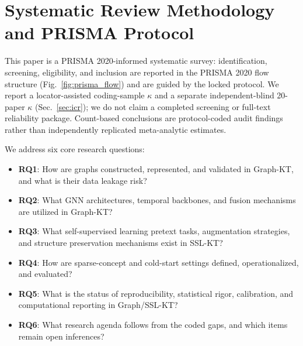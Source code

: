 \documentclass[lettersize,journal]{IEEEtran}
\begin{document}
\section{Systematic Review Methodology and PRISMA Protocol}
\label{sec:methodology}

This paper is a PRISMA 2020-informed systematic survey: identification, screening, eligibility, and inclusion are reported in the PRISMA 2020 flow structure (Fig.~\ref{fig:prisma_flow}) and are guided by the locked protocol. We report a locator-assisted coding-sample $\kappa$ and a separate independent-blind 20-paper $\kappa$ (Sec.~\ref{sec:icr}); we do not claim a completed screening or full-text reliability package. Count-based conclusions are protocol-coded audit findings rather than independently replicated meta-analytic estimates.

We address six core research questions:
\begin{itemize}
    \item \textbf{RQ1}: How are graphs constructed, represented, and validated in Graph-KT, and what is their data leakage risk?
    \item \textbf{RQ2}: What GNN architectures, temporal backbones, and fusion mechanisms are utilized in Graph-KT?
    \item \textbf{RQ3}: What self-supervised learning pretext tasks, augmentation strategies, and structure preservation mechanisms exist in SSL-KT?
    \item \textbf{RQ4}: How are sparse-concept and cold-start settings defined, operationalized, and evaluated?
    \item \textbf{RQ5}: What is the status of reproducibility, statistical rigor, calibration, and computational reporting in Graph/SSL-KT?
    \item \textbf{RQ6}: What research agenda follows from the coded gaps, and which items remain open inferences?
\end{itemize}
\end{document}

